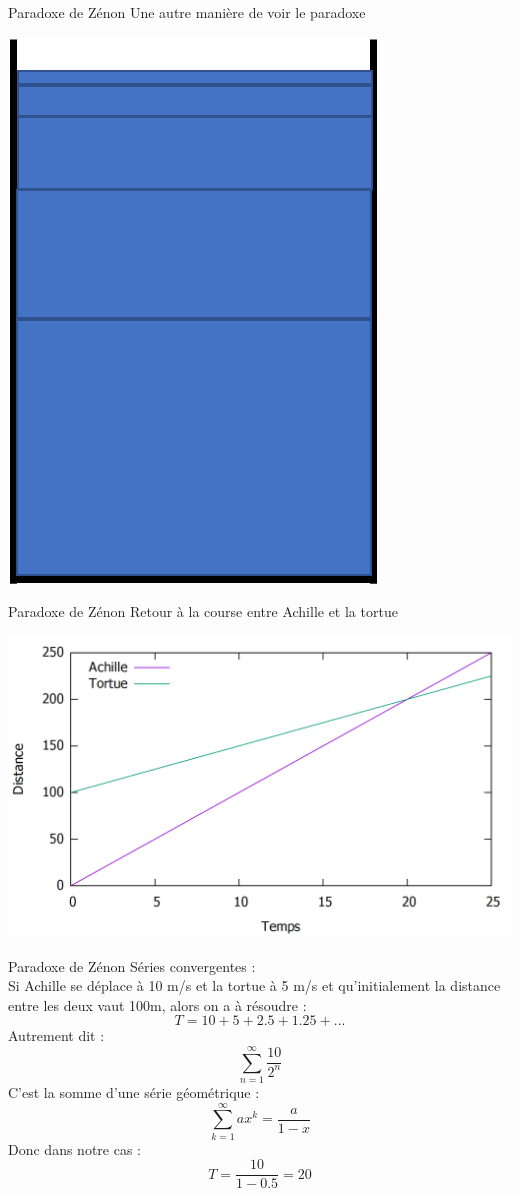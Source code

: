 \documentclass{beamer}
\begin{document}
\begin{frame}{Paradoxe de Zénon}
Une autre manière de voir le paradoxe
\begin{center}
	\includegraphics[scale=0.5]{glass5.png}
\end{center}
\end{frame}
\begin{frame}{Paradoxe de Zénon}
Retour à la course entre Achille et la tortue 
\pause
\begin{center}
	\includegraphics[scale=0.35]{ZAPT2.png}
\end{center}
\end{frame}
\begin{frame}{Paradoxe de Zénon}
	Séries convergentes :
	\\ Si Achille se déplace à 10 m/s et la tortue à 5 m/s et qu'initialement la distance entre les deux vaut 100m, alors on a à résoudre : 
	\[ T = 10 + 5 + 2.5 + 1.25 + ...\] \pause
	Autrement dit :
	\[ \sum_{n=1}^{\infty} \frac{10}{2^n}\]
	C'est la somme d'une série géométrique : \[\sum_{k=1}^{\infty} ax^k = \frac{a}{1-x} \] \pause 
	Donc dans notre cas : \[ T = \frac{10}{1- 0.5} = 20 \]
\end{frame}
\end{document}
